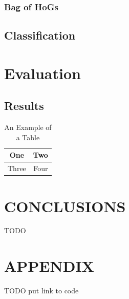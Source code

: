 \documentclass[letterpaper, 10 pt, conference]{ieeeconf}  %
\begin{document}
\subsubsection{Bag of HoGs}

\subsection{Classification}


\section{Evaluation}
\label{sec:eval}

\subsection{Results}


\begin{table}[h]
\caption{An Example of a Table}
\label{table_example}
\begin{center}
\begin{tabular}{|c||c|}
\hline
One & Two\\
\hline
Three & Four\\
\hline
\end{tabular}
\end{center}
\end{table}


\section{CONCLUSIONS}
\label{sec:concl}
TODO

\addtolength{\textheight}{-12cm}   %







\section*{APPENDIX}

TODO put link to code
\end{document}
